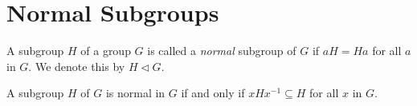 \section{Normal Subgroups}

\begin{definition}
	A subgroup $H$ of a group $G$ is called a \textit{normal} subgroup of $G$ if $aH = Ha$ for all $a$ in $G$. We denote this by $H \triangleleft G$.
\end{definition}

\begin{theorem}
	A subgroup $H$ of $G$ is normal in $G$ if and only if $xHx^{-1} \subseteq H$ for all $x$ in $G$.
\end{theorem}
